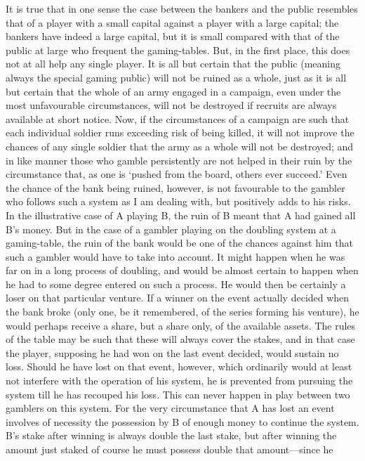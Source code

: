\documentclass[letterpaper,12pt,oneside,openany]{memoir}
\begin{document}
It is true that in one sense the case between the
bankers and the public resembles that of a player with
a small capital against a player with a large capital;
the bankers have indeed a large capital, but it is small
compared with that of the public at large who frequent
the gaming-tables. But, in the first place, this
does not at all help any single player. It is all but
certain that the public (meaning always the special
gaming public) will not be ruined as a whole, just as it
is all but certain that the whole of an army engaged in
a campaign, even under the most unfavourable circumstances,
will not be destroyed if recruits are always
available at short notice. Now, if the circumstances of
a campaign are such that each individual soldier runs
exceeding risk of being killed, it will not improve the
chances of any single soldier that the army as a whole
will not be destroyed; and in like manner those who
gamble persistently are not helped in their ruin by the
circumstance that, as one is `pushed from the board,
others ever succeed.' Even the chance of the bank
being ruined, however, is not favourable to the gambler
who follows such a system as I am dealing with, but
positively adds to his risks. In the illustrative case of
A playing B, the ruin of B meant that A had gained
all B's money. But in the case of a gambler playing on
the doubling system at a gaming-table, the ruin of the
bank would be one of the chances against him that such
a gambler would have to take into account. It might
happen when he was far on in a long process of doubling,
and would be almost certain to happen when he had to
some degree entered on such a process. He would then
be certainly a loser on that particular venture. If a
winner on the event actually decided when the bank
broke (only one, be it remembered, of the series forming
his venture), he would perhaps receive a share, but
a share only, of the available assets. The rules of the
table may be such that these will always cover the stakes,
and in that case the player, supposing he had won on
the last event decided, would sustain no loss. Should
he have lost on that event, however, which ordinarily
would at least not interfere with the operation of his
system, he is prevented from pursuing the system till he
has recouped his loss. This can never happen in play
between two gamblers on this system. For the very
circumstance that A has lost an event involves of necessity
the possession by B of enough money to continue
the system. B's stake after winning is always double
the last stake, but after winning the amount just staked
of course he must possess double that amount---since he
\end{document}
